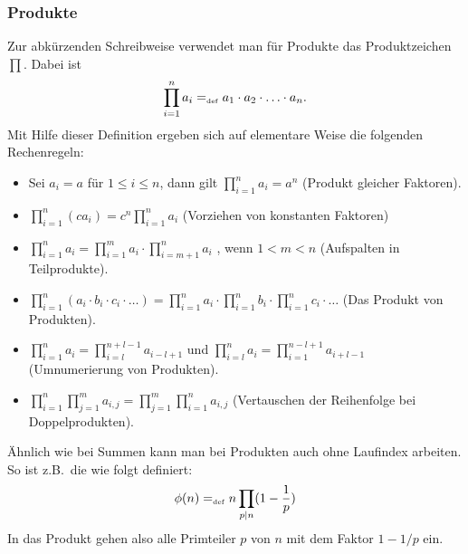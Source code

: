 \subsubsection{Produkte}

Zur abkürzenden Schreibweise verwendet man für Produkte das
Produktzeichen $\prod$\index{$\prod$}. Dabei ist
\begin{displaymath}
\prod_{i=1}^n a_i =_{\mathrm{\scriptscriptstyle def}} a_1 \cdot a_2 \cdot \ldots \cdot a_n.
\end{displaymath}
Mit Hilfe dieser Definition ergeben sich auf elementare Weise die
folgenden Rechenregeln:
\begin{itemize}
%
\item Sei $a_i = a$ für $1 \le i \le n$, dann gilt $\prod\limits_{i=1}^n a_i =
  a^n$ (Produkt gleicher Faktoren).
%
\item  $\prod\limits_{i=1}^n (c a_i) = c^n \prod\limits_{i=1}^n a_i$
  (Vorziehen von konstanten Faktoren)
%
\item $\prod\limits_{i=1}^n a_i = \prod\limits_{i=1}^m a_i \cdot
  \prod\limits_{i = m + 1}^n a_i$ , wenn $1 < m < n$ (Aufspalten in Teilprodukte).
%
\item $\prod\limits_{i=1}^n (a_i \cdot b_i \cdot c_i \cdot \ldots) =
  \prod\limits_{i=1}^n a_i \cdot \prod\limits_{i=1}^n b_i \cdot
  \prod\limits_{i=1}^n c_i \cdot \ldots$ (Das Produkt von Produkten).
%
\item $\prod\limits_{i=1}^n a_i = \prod\limits_{i=l}^{n + l - 1} a_{i-l+1}$
  und $\prod\limits_{i=l}^n a_i = \prod\limits_{i=1}^{n - l + 1} a_{i + l
  - 1}$
  (Umnumerierung von Produkten).
%
\item $\prod\limits_{i=1}^n \prod\limits_{j=1}^m a_{i,j} =
  \prod\limits_{j=1}^m \prod\limits_{i=1}^n a_{i,j}$ (Vertauschen der
  Reihenfolge bei Doppelprodukten).
%
\end{itemize}
Ähnlich wie bei Summen kann man bei Produkten auch ohne Laufindex arbeiten. So ist z.B.~die
 wie folgt definiert:
\begin{displaymath}
\phi(n) =_{\mathrm{\scriptscriptstyle def}} n \prod_{p \mid n} (1 - \frac{1}{p})
\end{displaymath}
In das Produkt gehen also alle Primteiler $p$ von $n$ mit dem Faktor $1 - 1/p$ ein.

